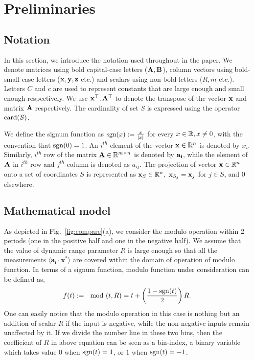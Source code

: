 \section{Preliminaries}
\label{sec:prelim}
\subsection{Notation}
\label{subsec:nota}
In this section, we introduce the notation used throughout in the paper. We denote matrices using bold capital-case letters ($\mathbf{A,B}$), column vectors using bold-small case letters ($\mathbf{x,y,z}$ etc.) and scalars using non-bold letters ($R,m$ etc.). Letters $C$ and $c$ are used to represent constants that are large enough and small enough respectively. We use $\mathbf{x}^\top,\mathbf{A}^\top$ to denote the transpose of the vector $\mathbf{x}$ and matrix $\mathbf{A}$ respectively. The cardinality of set $S$ is expressed using the operator $\mathrm{card}(S)$.

We define the signum function as $\mathrm{sgn}(x) := \frac{x}{|x|}$ for every $x \in {\mathbb{R}}, x \neq 0$, with the convention that $\mathrm{sgn}(0)=1$.
An $i^{th}$ element of the vector $\mathbf{x} \in {\mathbb{R}}^n$ is denoted by $x_{i}$. Similarly, $i^{th}$ row of the matrix $\mathbf{A} \in {\mathbb{R}}^{m \times n}$ is denoted by $\mathbf{a_i}$, while the element of $\mathbf{A}$ in $i^{th}$ row and $j^{th}$ column is denoted as $a_{ij}$. The projection of vector $\mathbf{x} \in {\mathbb{R}}^n$ onto a set of coordinates $S$ is represented as $\mathbf{x}_S \in {\mathbb{R}}^n,~\mathbf{x}_{S_j} = \mathbf{x}_j$ for $j \in S$, and $0$ elsewhere. 


\subsection{Mathematical model}
\label{subsec:model}
As depicted in Fig.~\ref{fig:compare}(a), we consider the modulo operation within 2 periods (one in the positive half and one in the negative half). We assume  that the value of dynamic range parameter $R$ is large enough so that all the measurements $\langle \mathbf{a_i} \cdot \mathbf{x^*} \rangle$ are covered within the domain of operation of modulo function. In terms of a signum function, modulo function under consideration can be defined as, 
$$
f(t) :=\mod(t,R) = t+\left( \frac{1-\mathrm{sgn}(t)}{2}\right)R.
$$
One can easily notice that the modulo operation in this case is nothing but an addition of scalar $R$ if the input is negative, while the non-negative inputs remain unaffected by it. If we divide the number line in these two bins, then the coefficient of $R$ in above equation can be seen as a bin-index, a binary variable which takes value $0$ when $\mathrm{sgn}(t)=1$, or $1$ when $\mathrm{sgn}(t)=-1$.

